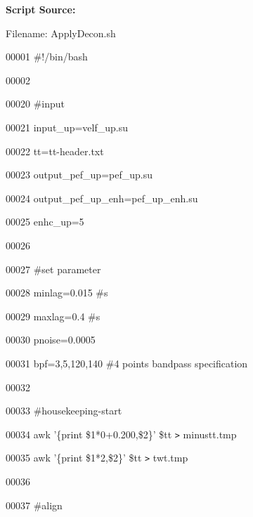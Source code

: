 \documentclass{article}
\begin{document}
\vspace{16pt}
\baselineskip=12pt
\leftskip=0pt
\textbf{Script Source:}

\vspace{4pt}
Filename: ApplyDecon.sh

\vspace{16pt}
00001 \#!/bin/bash

\vspace{4pt}
00002 

\vspace{4pt}
00020 \#input

\vspace{4pt}
00021 input\_up=velf\_up.su

\vspace{4pt}
00022 tt=tt-header.txt

\vspace{4pt}
00023 output\_pef\_up=pef\_up.su

\vspace{4pt}
00024 output\_pef\_up\_enh=pef\_up\_enh.su

\vspace{4pt}
00025 enhc\_up=5

\vspace{4pt}
00026 

\vspace{4pt}
00027 \#set parameter

\vspace{4pt}
00028 minlag=0.015 \#s

\vspace{4pt}
00029 maxlag=0.4 \#s

\vspace{4pt}
00030 pnoise=0.0005

\vspace{4pt}
00031 bpf=3,5,120,140 \#4 points bandpass specification

\vspace{4pt}
00032 

\vspace{4pt}
00033 \#housekeeping-start

\vspace{4pt}
00034 awk '\{print \$1*0+0.200,\$2\}' \$tt \texttt{>} minustt.tmp

\vspace{4pt}
00035 awk '\{print \$1*2,\$2\}' \$tt \texttt{>} twt.tmp

\vspace{4pt}
00036 

\vspace{4pt}
00037 \#align 
\end{document}

